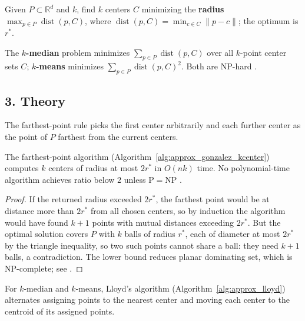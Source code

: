 \begin{definition}[$k$-Center]\label{def:approx_kcenter}
  Given $P \subset \mathbb{R}^d$ and $k$, find $k$ centers $C$ minimizing the
  \textbf{radius} $\max_{p \in P}\operatorname{dist}(p, C)$, where
  $\operatorname{dist}(p, C) = \min_{c \in C}\|p - c\|$; the optimum is $r^*$.
\end{definition}

\begin{definition}\label{def:approx_kmedian}
  The \textbf{$k$-median} problem minimizes
  $\sum_{p \in P}\operatorname{dist}(p, C)$ over all $k$-point center sets
  $C$; \textbf{$k$-means} minimizes $\sum_{p \in P}\operatorname{dist}(p, C)^2$.
  Both are NP-hard \cite{gonzalez1985}.
\end{definition}

\subsection{3. Theory}

The farthest-point rule picks the first center arbitrarily and each further
center as the point of $P$ farthest from the current centers.

\begin{theorem}\label{thm:approx_gonzalez_bound}
  The farthest-point algorithm
  (Algorithm~\ref{alg:approx_gonzalez_kcenter}) computes $k$ centers of
  radius at most $2 r^*$ in $O(nk)$ time. No polynomial-time algorithm
  achieves ratio below $2$ unless $\mathrm{P} = \mathrm{NP}$
  \cite{gonzalez1985}.
\end{theorem}

\begin{proof}
  If the returned radius exceeded $2 r^*$, the farthest point would be at
  distance more than $2 r^*$ from all chosen centers, so by induction the
  algorithm would have found $k + 1$ points with mutual distances exceeding
  $2 r^*$. But the optimal solution covers $P$ with $k$ balls of radius
  $r^*$, each of diameter at most $2 r^*$ by the triangle inequality, so two
  such points cannot share a ball: they need $k + 1$ balls, a contradiction.
  The lower bound reduces planar dominating set, which is NP-complete; see
  \cite{gonzalez1985}.
\end{proof}

For $k$-median and $k$-means, Lloyd's algorithm
(Algorithm~\ref{alg:approx_lloyd}) alternates assigning points to the
nearest center and moving each center to the centroid of its assigned
points.

